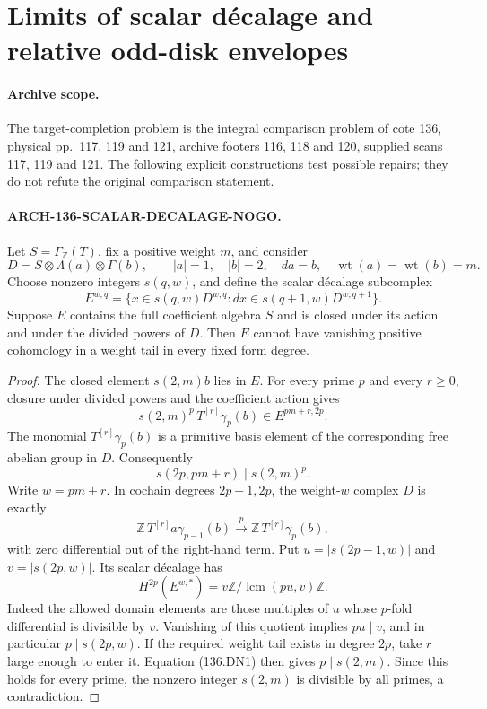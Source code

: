 \section{Limits of scalar décalage and relative odd-disk envelopes}

\paragraph{Archive scope.}
The target-completion problem is the integral comparison problem of
cote 136, physical pp.~117, 119 and 121, archive footers 116, 118 and 120,
supplied scans 117, 119 and 121. The following explicit constructions
test possible repairs; they do not refute the original comparison statement.

\paragraph{ARCH-136-SCALAR-DECALAGE-NOGO.}
Let \(S=\Gamma_{\mathbb Z}(T)\), fix a positive weight \(m\), and consider
\[
 D=S\otimes\Lambda(a)\otimes\Gamma(b),\qquad
 |a|=1,\quad |b|=2,\quad da=b,\quad
 \operatorname{wt}(a)=\operatorname{wt}(b)=m .
\]
Choose nonzero integers \(s(q,w)\), and define the scalar décalage subcomplex
\[
 E^{w,q}=\{x\in s(q,w)D^{w,q}:
             dx\in s(q+1,w)D^{w,q+1}\}.
\]
Suppose \(E\) contains the full coefficient algebra \(S\) and is closed under its action and under the divided powers of \(D\). Then \(E\) cannot have vanishing positive cohomology in a weight tail in every fixed form degree.

\begin{proof}
The closed element \(s(2,m)b\) lies in \(E\). For every prime \(p\) and every \(r\geq0\), closure under divided powers and the coefficient action gives
\[
 s(2,m)^p\,T^{[r]}\gamma_p(b)\in E^{pm+r,2p}.
\]
The monomial \(T^{[r]}\gamma_p(b)\) is a primitive basis element of the corresponding free abelian group in \(D\). Consequently
\[
          s(2p,pm+r)\mid s(2,m)^p.                  \tag{136.DN1}
\]
Write \(w=pm+r\). In cochain degrees \(2p-1,2p\), the weight-\(w\) complex \(D\) is exactly
\[
 \mathbb Z\,T^{[r]}a\gamma_{p-1}(b)
       \xrightarrow{\ p\ }
 \mathbb Z\,T^{[r]}\gamma_p(b),
\]
with zero differential out of the right-hand term. Put
\(u=|s(2p-1,w)|\) and \(v=|s(2p,w)|\). Its scalar décalage has
\[
 H^{2p}(E^{w,*})
   =v\mathbb Z/
       \operatorname{lcm}(pu,v)\mathbb Z .
\]
Indeed the allowed domain elements are those multiples of \(u\) whose \(p\)-fold differential is divisible by \(v\). Vanishing of this quotient implies \(pu\mid v\), and in particular \(p\mid s(2p,w)\). If the required weight tail exists in degree \(2p\), take \(r\) large enough to enter it. Equation (136.DN1) then gives \(p\mid s(2,m)\). Since this holds for every prime, the nonzero integer \(s(2,m)\) is divisible by all primes, a contradiction.
\end{proof}

